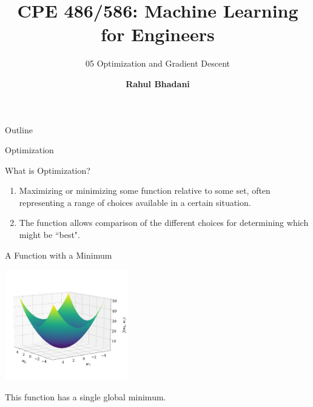 \documentclass[aspectratio=169,xcolor=dvipsnames,svgnames,x11names,fleqn]{beamer}
\title[CPE 486/586: Machine Learning]{CPE 486/586: Machine Learning for Engineers} %
\subtitle{05 Optimization and Gradient Descent}
\author[Rahul Bhadani] {{\Large \textbf{Rahul Bhadani}}}
\institute[UAH] %
{
    Electrical \& Computer Engineering,  The University of Alabama in Huntsville
}
\date
\begin{document}
\begin{frame}
    \titlepage
\end{frame}

\begin{frame}{Outline}
    \backgroundtableofcontents
\end{frame}

\begin{sectionframe}{\faGavel}{Optimization}
\end{sectionframe}

\begin{frame}{What is Optimization?}

    \begin{center}
        \begin{enumerate}
            \item Maximizing or minimizing some function relative to some set,
            often representing a range of choices available in a certain situation.
            \item The function
            allows comparison of the different choices for determining which might be ``best".
        \end{enumerate}
    \end{center}
    
\end{frame}

\begin{frame}{A Function with a Minimum}
\begin{center}
\includegraphics[width=0.40\textwidth]{figures/quadratic_surface.pdf}

    This function has a single global minimum.
\end{center}
\end{frame}
\end{document}
